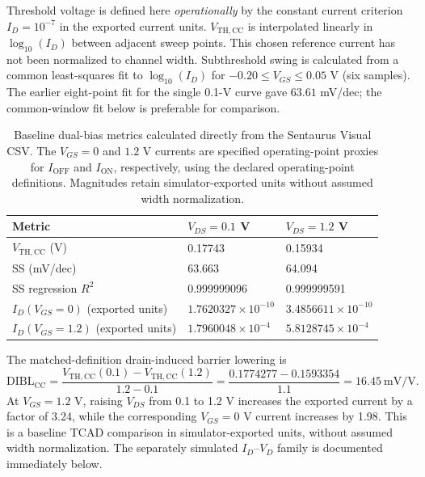 Threshold voltage is defined here \emph{operationally} by the constant
current criterion $I_D=10^{-7}$ in the exported current units.
$V_{\mathrm{TH,CC}}$ is interpolated linearly in $\log_{10}(I_D)$ between
adjacent sweep points. This chosen reference current has not been normalized
to channel width. Subthreshold swing is calculated from a common least-squares
fit to $\log_{10}(I_D)$ for $-0.20\leq V_{GS}\leq0.05$ V (six samples).
The earlier eight-point fit for the single 0.1-V curve gave
$63.61$ mV/dec; the common-window fit below is preferable for comparison.

\begin{table}[H]\centering
\caption{Baseline dual-bias metrics calculated directly from the Sentaurus
Visual CSV. The $V_{GS}=0$ and $1.2$ V currents are specified operating-point
proxies for $I_{\mathrm{OFF}}$ and $I_{\mathrm{ON}}$, respectively,
using the declared operating-point definitions. Magnitudes retain simulator-exported units without assumed width normalization.}
\begin{tabular}{@{}lll@{}}\toprule
Metric & $V_{DS}=0.1$ V & $V_{DS}=1.2$ V\\\midrule
$V_{\mathrm{TH,CC}}$ (V) & 0.17743 & 0.15934\\
SS (mV/dec) & 63.663 & 64.094\\
SS regression $R^2$ & 0.999999096 & 0.999999591\\
$I_D(V_{GS}=0)$ (exported units) & $1.7620327\times10^{-10}$ & $3.4856611\times10^{-10}$\\
$I_D(V_{GS}=1.2)$ (exported units) & $1.7960048\times10^{-4}$ & $5.8128745\times10^{-4}$\\
\bottomrule\end{tabular}
\end{table}

The matched-definition drain-induced barrier lowering is
\[
\mathrm{DIBL}_{\mathrm{CC}}=
\frac{V_{\mathrm{TH,CC}}(0.1)-V_{\mathrm{TH,CC}}(1.2)}
{1.2-0.1}
=\frac{0.1774277-0.1593354}{1.1}
=\boxed{16.45\ \mathrm{mV/V}}.
\]
At $V_{GS}=1.2$ V, raising $V_{DS}$ from 0.1 to 1.2 V increases the
exported current by a factor of 3.24, while the corresponding
$V_{GS}=0$ V current increases by 1.98. This is a baseline TCAD
comparison in simulator-exported units, without assumed width normalization.
The separately simulated $I_D$--$V_D$ family is documented immediately below.
